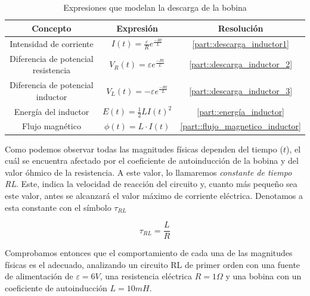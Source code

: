 \documentclass[../main.tex]{subfiles}
\begin{document}
\begin{table}[!ht]
        \begin{center}
            \begin{tabular}{|| c | c | c ||}
                \hline
                \textbf{Concepto} & \textbf{Expresión} &  \textbf{Resolución}\\ \hline
                Intensidad de corriente & $I(t) = \frac{\varepsilon}{R}  e^{\frac{-Rt}{L}}$ & \ref{part::descarga_inductor1}\\
                Diferencia de potencial resistencia & $V_R(t) = \varepsilon  e^{\frac{-Rt}{L}}$ & \ref{part::descarga_inductor_2} \\ 
                Diferencia de potencial inductor & $V_L(t) = - \varepsilon   e^{\frac{-Rt}{L}}$ & \ref{part::descarga_inductor_3} \\ 
                Energía del inductor & $E(t) = \frac{1}{2}LI(t)^2 $ & \ref{part::energía_inductor} \\
                Flujo magnético & $\phi (t) = L \cdot I(t)$ & \ref{part::flujo_magnetico_inductor} \\
                \hline
                \end{tabular}
                \caption{Expresiones que modelan la descarga de la bobina}
                \label{tab::ecuaciones_descarga_rl}
        \end{center}
    \end{table}

Como podemos observar todas las magnitudes físicas dependen del tiempo ($t$), el cuál se encuentra afectado por el coeficiente de autoinducción de la bobina y del valor óhmico de la resistencia. A este valor, lo llamaremos \textit{constante de tiempo RL}. Este, indica la velocidad de reacción del circuito y, cuanto más pequeño sea este valor, antes se alcanzará el valor máximo de corriente eléctrica. Denotamos a esta constante con el símbolo $\tau_{RL}$

\begin{equation}
    \label{eqq::constante_tiempo_rl}
    \tau_{RL} = \frac{L}{R}
\end{equation}

Comprobamos entonces que el comportamiento de cada una de las magnitudes físicas es el adecuado, analizando un circuito RL de primer orden con una fuente de alimentación de $\varepsilon = 6V$, una resistencia eléctrica $R=1\Omega$ y una bobina con un coeficiente de autoinducción $L=10mH$. \\
\end{document}
